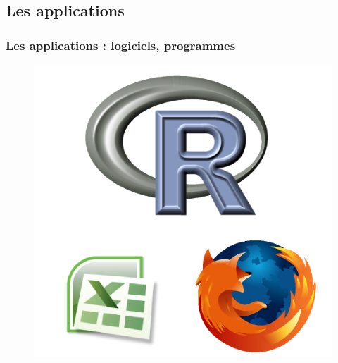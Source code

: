 \documentclass[handout, table,svgnames,hyperref={pdfpagemode=FullScreen}]{beamer}
\begin{document}
\subsection{Les applications}
\begin{frame}
	\frametitle{Les applications : logiciels, programmes}
	\begin{figure}[h]
		\begin{center}
		  \includegraphics[scale=0.45]{image/software.png}
		\end{center}
	\end{figure}
\end{frame}
\end{document}
